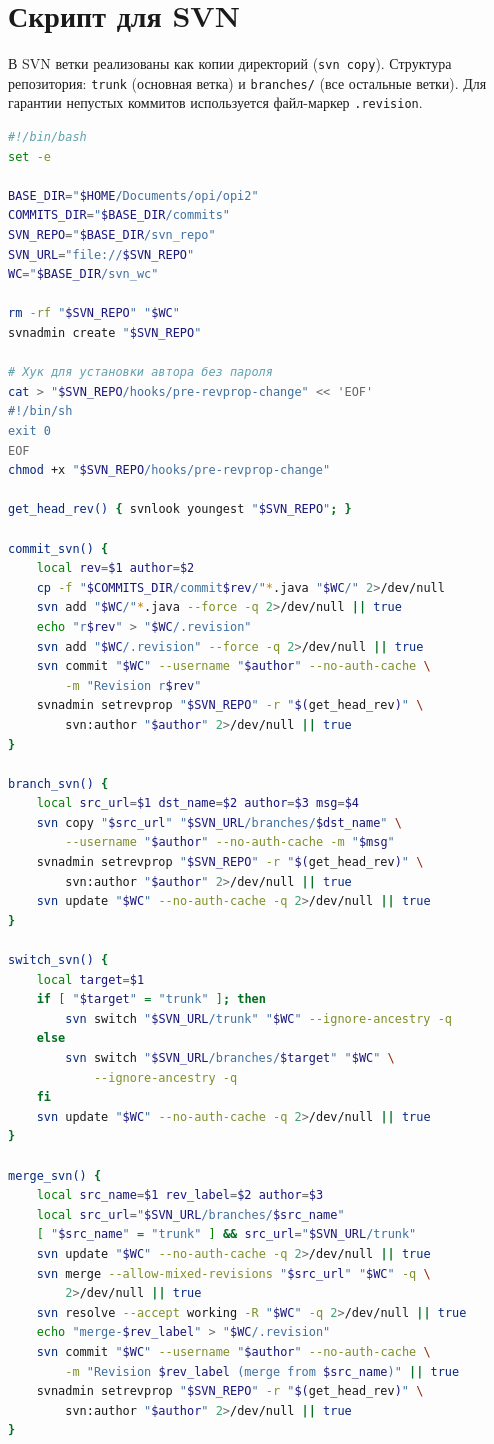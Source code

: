 \documentclass[12pt,a4paper]{article}
\begin{document}
\newpage
\section{Скрипт для SVN}

В SVN ветки реализованы как копии директорий (\texttt{svn copy}).
Структура репозитория: \texttt{trunk} (основная ветка) и \texttt{branches/} (все остальные ветки).
Для гарантии непустых коммитов используется файл-маркер \texttt{.revision}.

\begin{lstlisting}[language=bash]
#!/bin/bash
set -e

BASE_DIR="$HOME/Documents/opi/opi2"
COMMITS_DIR="$BASE_DIR/commits"
SVN_REPO="$BASE_DIR/svn_repo"
SVN_URL="file://$SVN_REPO"
WC="$BASE_DIR/svn_wc"

rm -rf "$SVN_REPO" "$WC"
svnadmin create "$SVN_REPO"

# Хук для установки автора без пароля
cat > "$SVN_REPO/hooks/pre-revprop-change" << 'EOF'
#!/bin/sh
exit 0
EOF
chmod +x "$SVN_REPO/hooks/pre-revprop-change"

get_head_rev() { svnlook youngest "$SVN_REPO"; }

commit_svn() {
    local rev=$1 author=$2
    cp -f "$COMMITS_DIR/commit$rev/"*.java "$WC/" 2>/dev/null
    svn add "$WC/"*.java --force -q 2>/dev/null || true
    echo "r$rev" > "$WC/.revision"
    svn add "$WC/.revision" --force -q 2>/dev/null || true
    svn commit "$WC" --username "$author" --no-auth-cache \
        -m "Revision r$rev"
    svnadmin setrevprop "$SVN_REPO" -r "$(get_head_rev)" \
        svn:author "$author" 2>/dev/null || true
}

branch_svn() {
    local src_url=$1 dst_name=$2 author=$3 msg=$4
    svn copy "$src_url" "$SVN_URL/branches/$dst_name" \
        --username "$author" --no-auth-cache -m "$msg"
    svnadmin setrevprop "$SVN_REPO" -r "$(get_head_rev)" \
        svn:author "$author" 2>/dev/null || true
    svn update "$WC" --no-auth-cache -q 2>/dev/null || true
}

switch_svn() {
    local target=$1
    if [ "$target" = "trunk" ]; then
        svn switch "$SVN_URL/trunk" "$WC" --ignore-ancestry -q
    else
        svn switch "$SVN_URL/branches/$target" "$WC" \
            --ignore-ancestry -q
    fi
    svn update "$WC" --no-auth-cache -q 2>/dev/null || true
}

merge_svn() {
    local src_name=$1 rev_label=$2 author=$3
    local src_url="$SVN_URL/branches/$src_name"
    [ "$src_name" = "trunk" ] && src_url="$SVN_URL/trunk"
    svn update "$WC" --no-auth-cache -q 2>/dev/null || true
    svn merge --allow-mixed-revisions "$src_url" "$WC" -q \
        2>/dev/null || true
    svn resolve --accept working -R "$WC" -q 2>/dev/null || true
    echo "merge-$rev_label" > "$WC/.revision"
    svn commit "$WC" --username "$author" --no-auth-cache \
        -m "Revision $rev_label (merge from $src_name)" || true
    svnadmin setrevprop "$SVN_REPO" -r "$(get_head_rev)" \
        svn:author "$author" 2>/dev/null || true
}


\end{lstlisting}
\end{document}
